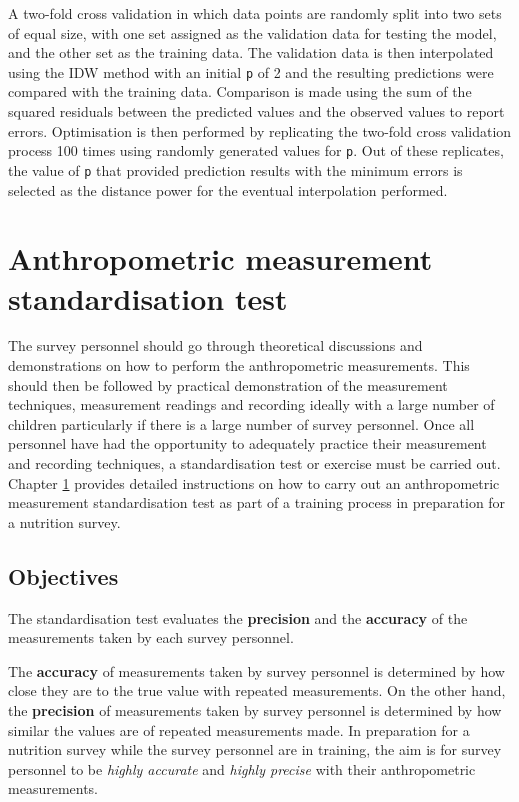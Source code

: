 \documentclass[12pt,a4paper]{book}
\theoremstyle{definition}
\theoremstyle{definition}
\theoremstyle{definition}
\theoremstyle{remark}
\begin{document}
A two-fold cross validation \citep{bivand2008applied} in which data
points are randomly split into two sets of equal size, with one set
assigned as the validation data for testing the model, and the other set
as the training data. The validation data is then interpolated using the
IDW method with an initial \texttt{p} of 2 and the resulting predictions
were compared with the training data. Comparison is made using the sum
of the squared residuals between the predicted values and the observed
values to report errors. Optimisation is then performed by replicating
the two-fold cross validation process 100 times using randomly generated
values for \texttt{p}. Out of these replicates, the value of \texttt{p}
that provided prediction results with the minimum errors is selected as
the distance power for the eventual interpolation performed.

\hypertarget{standard}{%
\chapter{Anthropometric measurement standardisation
test}\label{standard}}

The survey personnel should go through theoretical discussions and
demonstrations on how to perform the anthropometric measurements. This
should then be followed by practical demonstration of the measurement
techniques, measurement readings and recording ideally with a large
number of children particularly if there is a large number of survey
personnel. Once all personnel have had the opportunity to adequately
practice their measurement and recording techniques, a standardisation
test or exercise must be carried out. Chapter \ref{standard} provides
detailed instructions on how to carry out an anthropometric measurement
standardisation test as part of a training process in preparation for a
nutrition survey.

\hypertarget{objectives}{%
\section{Objectives}\label{objectives}}

The standardisation test evaluates the \textbf{precision} and the
\textbf{accuracy} of the measurements taken by each survey personnel.

The \textbf{accuracy} of measurements taken by survey personnel is
determined by how close they are to the true value with repeated
measurements. On the other hand, the \textbf{precision} of measurements
taken by survey personnel is determined by how similar the values are of
repeated measurements made. In preparation for a nutrition survey while
the survey personnel are in training, the aim is for survey personnel to
be \emph{highly accurate} and \emph{highly precise} with their
anthropometric measurements.
\end{document}
